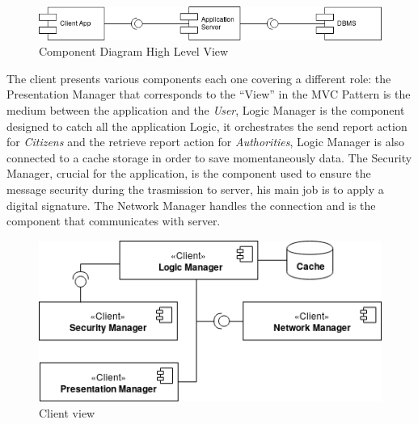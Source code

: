 \documentclass{article}
\begin{document}
\begin{figure}[H]
    \centering
    \includegraphics[scale=0.4]{img/component_diagrams/component_diagram.png}
    \caption{Component Diagram High Level View}
\end{figure}
The client presents various components 
each one covering a different role: the Presentation Manager that corresponds to the “View” in the MVC Pattern 
is the medium between the application and the \textit{User}, Logic Manager is the component designed to catch 
all the application Logic, it orchestrates the send report action for \textit{Citizens} and the retrieve report 
action for \textit{Authorities}, Logic Manager is also connected to a cache storage in order to save momentaneously 
data. The Security Manager, crucial for the application, is the component used to ensure the message security 
during the trasmission to server, his main job is to apply a digital signature. The Network Manager handles the
connection and is the component that communicates with server.

\begin{figure}[H]
    \centering
    \includegraphics[scale=0.6]{img/component_diagrams/client_component.png}
    \caption{Client view}
\end{figure}
\end{document}
